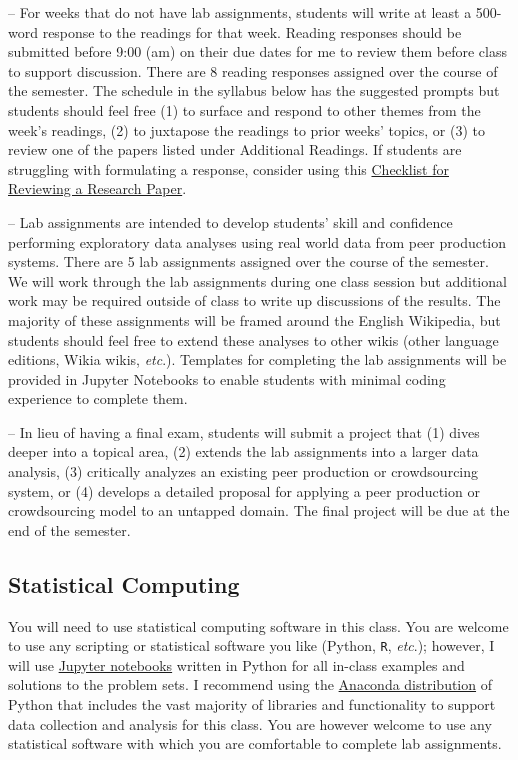 \documentclass[10pt]{memoir}
\begin{document}
\begin{description}[itemsep=0pt,labelsep=0pt]
    \item[Readings Responses] -- For weeks that do not have lab assignments, students will write at least a 500-word response to the readings for that week. Reading responses should be submitted before 9:00 (am) on their due dates for me to review them before class to support discussion. There are 8 reading responses assigned over the course of the semester. The schedule in the syllabus below has the suggested prompts but students should feel free (1) to surface and respond to other themes from the week's readings, (2) to juxtapose the readings to prior weeks' topics, or (3) to review one of the papers listed under Additional Readings. If students are struggling with formulating a response, consider using this \href{http://www.brianckeegan.com/2014/03/checklist-for-reviewing-and-thus-writing-a-research-paper/}{Checklist for Reviewing a Research Paper}.
    \item[Lab Assignments ] -- Lab assignments are intended to develop students' skill and confidence performing exploratory data analyses using real world data from peer production systems. There are 5 lab assignments assigned over the course of the semester. We will work through the lab assignments during one class session but additional work may be required outside of class to write up discussions of the results. The majority of these assignments will be framed around the English Wikipedia, but students should feel free to extend these analyses to other wikis (other language editions, Wikia wikis, \textit{etc}.). Templates for completing the lab assignments will be provided in Jupyter Notebooks to enable students with minimal coding experience to complete them. 
    \item[Final Project ] -- In lieu of having a final exam, students will submit a project that (1) dives deeper into a topical area, (2) extends the lab assignments into a larger data analysis, (3) critically analyzes an existing peer production or crowdsourcing system, or (4) develops a detailed proposal for applying a peer production or crowdsourcing model to an untapped domain. The final project will be due at the end of the semester.
\end{description}

\subsection{Statistical Computing}
You will need to use statistical computing software in this class. You are welcome to use any scripting or statistical software you like (Python, \texttt{R}, \textit{etc}.); however, I will use \href{http://jupyter.org/}{Jupyter notebooks} written in Python for all in-class examples and solutions to the problem sets. I recommend using the \href{https://www.continuum.io/why-anaconda}{Anaconda distribution} of Python that includes the vast majority of libraries and functionality to support data collection and analysis for this class. You are however welcome to use any statistical software with which you are comfortable to complete lab assignments.
\end{document}

